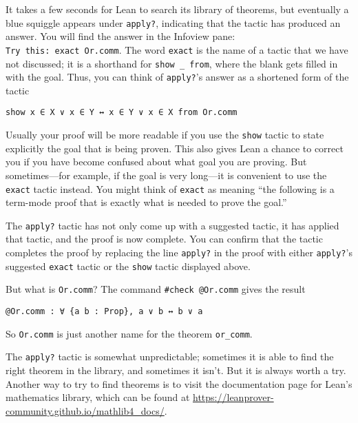 \documentclass[
  letterpaper,
  DIV=11,
  numbers=noendperiod]{scrreprt}
\newenvironment{ind}
	{\begin{list}{}{\setlength{\leftmargin}{1em}}\item\relax}
	{\end{list}}
\theoremstyle{remark}
\begin{document}
It takes a few seconds for Lean to search its library of theorems, but
eventually a blue squiggle appears under \texttt{apply?}, indicating
that the tactic has produced an answer. You will find the answer in the
Infoview pane: \texttt{Try\ this:\ exact\ Or.comm}. The word
\texttt{exact} is the name of a tactic that we have not discussed; it is
a shorthand for \texttt{show\ \_\ from}, where the blank gets filled in
with the goal. Thus, you can think of \texttt{apply?}'s answer as a
shortened form of the tactic

\begin{ind}

\begin{verbatim}
show x ∈ X ∨ x ∈ Y ↔ x ∈ Y ∨ x ∈ X from Or.comm
\end{verbatim}

\end{ind}

Usually your proof will be more readable if you use the \texttt{show}
tactic to state explicitly the goal that is being proven. This also
gives Lean a chance to correct you if you have become confused about
what goal you are proving. But sometimes---for example, if the goal is
very long---it is convenient to use the \texttt{exact} tactic instead.
You might think of \texttt{exact} as meaning ``the following is a
term-mode proof that is exactly what is needed to prove the goal.''

The \texttt{apply?} tactic has not only come up with a suggested tactic,
it has applied that tactic, and the proof is now complete. You can
confirm that the tactic completes the proof by replacing the line
\texttt{apply?} in the proof with either \texttt{apply?}'s suggested
\texttt{exact} tactic or the \texttt{show} tactic displayed above.

But what is \texttt{Or.comm}? The command \texttt{\#check\ @Or.comm}
gives the result

\begin{ind}

\begin{verbatim}
@Or.comm : ∀ {a b : Prop}, a ∨ b ↔ b ∨ a
\end{verbatim}

\end{ind}

So \texttt{Or.comm} is just another name for the theorem
\texttt{or\_comm}.

The \texttt{apply?} tactic is somewhat unpredictable; sometimes it is
able to find the right theorem in the library, and sometimes it isn't.
But it is always worth a try. Another way to try to find theorems is to
visit the documentation page for Lean's mathematics library, which can
be found at \url{https://leanprover-community.github.io/mathlib4_docs/}.
\end{document}

